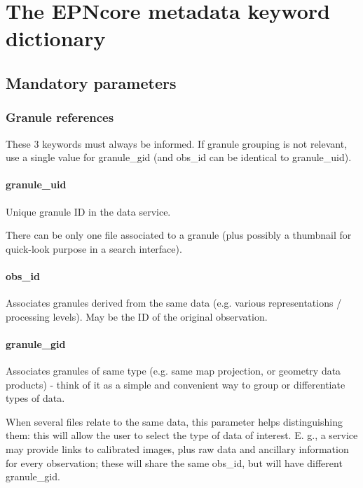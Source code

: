 \documentclass[11pt,a4paper]{ivoa}
\begin{document}
\section{The EPNcore metadata keyword dictionary} 

\subsection{Mandatory parameters}

\subsubsection{Granule references}

These 3 keywords must always be informed. If granule grouping is not relevant, use a single value for granule\_gid (and obs\_id can be identical to granule\_uid).

\paragraph{granule\_uid}

Unique granule ID in the data service.

There can be only one file associated to a granule (plus possibly a thumbnail for quick-look purpose in a search interface).

\paragraph{obs\_id}

Associates granules derived from the same data (e.g. various representations / processing levels). May be the ID of the original observation.

\paragraph{granule\_gid}

Associates granules of same type (e.g. same map projection, or geometry data products) - think of it as a simple and convenient way to group or differentiate types of data.

When several files relate to the same data, this parameter helps distinguishing them: this will allow the user to select the type of data of interest. E. g., a service may provide links to calibrated images, plus raw data and ancillary information for every observation; these will share the same obs\_id, but will have different granule\_gid.
\end{document}
